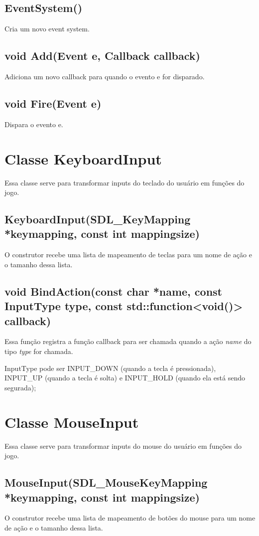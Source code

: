 \subsection{EventSystem()}
Cria um novo event system.

\subsection{void Add(Event e, Callback callback)}
Adiciona um novo callback para quando o evento e for disparado.

\subsection{void Fire(Event e)}
Dispara o evento e.

\section{Classe KeyboardInput}
\label{doc:keyboardinput}
Essa classe serve para transformar inputs do teclado do usuário em funções do jogo.

\subsection{KeyboardInput(SDL\_KeyMapping *keymapping, const int mappingsize)}
O construtor recebe uma lista de mapeamento de teclas para um nome de ação e o tamanho dessa lista.

\subsection{void BindAction(const char *name, const InputType type, const std::function<void()> callback)}
Essa função registra a função callback para ser chamada quando a ação \textit{name}  do tipo \textit{type} for chamada.

InputType pode ser INPUT\_DOWN (quando a tecla é pressionada), INPUT\_UP (quando a tecla é solta)  e INPUT\_HOLD (quando ela está sendo segurada);

\section{Classe MouseInput}
\label{doc:mouseinput}
Essa classe serve para transformar inputs do mouse do usuário em funções do jogo.

\subsection{MouseInput(SDL\_MouseKeyMapping *keymapping, const int mappingsize)}
O construtor recebe uma lista de mapeamento de botões do mouse para um nome de ação e o tamanho dessa lista.

